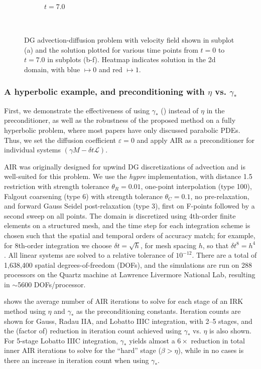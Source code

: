 \documentclass[review]{siamart}
\begin{document}
\begin{figure}[!htb]
\begin{subfigure}[b]{0.3\textwidth}
    \caption{$t = 7.0$}
  \end{subfigure}
  \\\vspace{2ex}
      \caption{DG advection-diffusion problem with velocity field shown in
      subplot (a) and the solution plotted for various time points from
      $t=0$ to $t = 7.0$ in subplots (b-f). Heatmap indicates solution in the
      2d domain, with blue $\mapsto 0$ and red $\mapsto 1$.}
  \label{fig:ad_advdiff}
\end{figure}

\subsubsection{A hyperbolic example, and preconditioning with $\eta$ vs. $\gamma_*$}
\label{sec:numerics:dg:const}

First, we demonstrate the effectiveness of using $\gamma_*$ ()
instead of $\eta$ in the preconditioner, as well as the robustness of the proposed
method on a fully hyperbolic problem, where most papers have only discussed parabolic
PDEs. Thus, we set the diffusion coefficient $\varepsilon = 0$
and apply AIR as a preconditioner for individual systems
$(\gamma M - \delta t\mathcal{L})$.

AIR was originally designed for upwind DG discretizations of advection
and is well-suited for this problem. We use the \textit{hypre} implementation,
with distance 1.5 restriction with strength tolerance $\theta_R=0.01$, one-point
interpolation (type 100), Falgout coarsening (type 6) with strength tolerance
$\theta_C=0.1$, no pre-relaxation, and forward Gauss Seidel
post-relaxation (type 3), first on F-points followed by a second sweep on
all points. The domain is discretized using 4th-order finite elements on a
structured mesh, and the time step for each integration scheme is chosen
such that the spatial and temporal orders of accuracy match; for example,
for 8th-order integration we choose $\delta t = \sqrt{h}$, for mesh spacing
$h$, so that $\delta t^8 = h^4$. All linear systems are solved to a relative
tolerance of $10^{-12}$. There are a total of 1,638,400 spatial degrees-of-freedom
(DOFs), and the simulations are run on 288 processors on the Quartz machine at
Lawrence Livermore National Lab, resulting in $\sim$5600 DOFs/processor.

 shows the average number of AIR iterations to solve for
each stage of an IRK method using $\eta$ and $\gamma_*$ as the preconditioning
constants. Iteration counts are shown for Gauss, Radau IIA, and Lobatto IIIC integration,
with 2--5 stages, and the (factor of) reduction in iteration count achieved using $\gamma_*$
vs. $\eta$ is also shown. For 5-stage Lobatto IIIC integration, $\gamma_*$ yields
almost a $6\times$ reduction in total inner AIR iterations to solve for the
``hard'' stage ($\beta > \eta$), while in no cases is there an increase in
iteration count when using $\gamma_*$.
\end{document}
